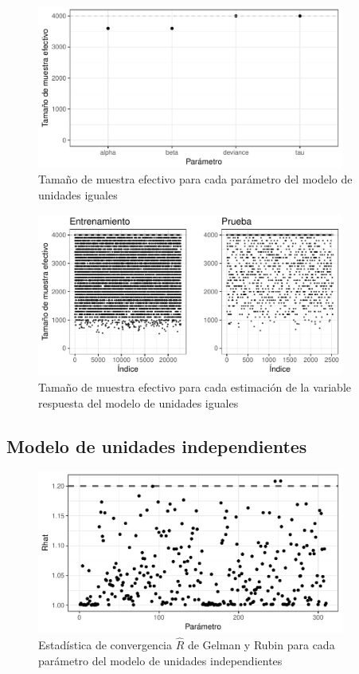 \begin{figure}[H]
    \centering
    \includegraphics[width=0.9\textwidth]{images/comp_pooling_n_eff_params.pdf}
    \caption{Tamaño de muestra efectivo para cada parámetro del modelo de unidades iguales}
    \label{fig:comp_pooling_n_eff_params}
\end{figure}

\begin{figure}[H]
    \centering
    \includegraphics[width=0.9\textwidth]{images/comp_pooling_n_eff_yf.pdf}
    \caption{Tamaño de muestra efectivo para cada estimación de la variable respuesta del modelo de unidades iguales}
    \label{fig:comp_pooling_n_eff_yf}
\end{figure}



\subsection*{Modelo de unidades independientes}

\begin{figure}[H]
    \centering
    \includegraphics[width=0.9\textwidth]{images/no_pooling_r_statistic_params.pdf}
    \caption{Estadística de convergencia $\hat{R}$ de Gelman y Rubin para cada parámetro del modelo de unidades independientes}
    \label{fig:no_pooling_r_statistic_params}
\end{figure}

